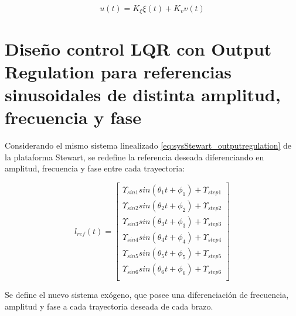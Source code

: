 \begin{equation} \label{eq:OR_law_control_fija}
    u(t) = K_\xi \xi(t) + K_v v(t)
\end{equation}






\section{Diseño control LQR con Output Regulation para referencias sinusoidales de distinta amplitud, frecuencia y fase}

Considerando el mismo sistema linealizado \ref{eq:sysStewart_outputregulation} de la plataforma Stewart, se redefine la referencia deseada diferenciando en amplitud, frecuencia y fase entre cada trayectoria:

\begin{equation}
    l_{ref}(t) = \begin{bmatrix}
        \Upsilon_{sin1} sin(\theta_1 t + \phi_1) + \Upsilon_{step1}\\
        \Upsilon_{sin2} sin(\theta_2 t + \phi_2) + \Upsilon_{step2}\\
        \Upsilon_{sin3} sin(\theta_3 t + \phi_3) + \Upsilon_{step3}\\
        \Upsilon_{sin4} sin(\theta_4 t + \phi_4) + \Upsilon_{step4}\\
        \Upsilon_{sin5} sin(\theta_5 t + \phi_5) + \Upsilon_{step5}\\
        \Upsilon_{sin6} sin(\theta_6 t + \phi_6) + \Upsilon_{step6}\\
    \end{bmatrix}
\end{equation}

Se define el nuevo sistema exógeno, que posee una diferenciación de frecuencia, amplitud y fase a cada trayectoria deseada de cada brazo. 

